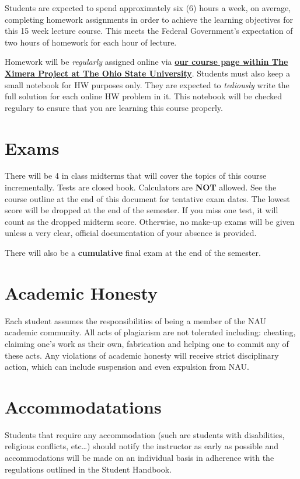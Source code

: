 \documentclass[handout]{ximera}
\begin{document}
Students are expected to spend approximately six (6) hours a week, on average, completing homework assignments in order to achieve the learning objectives for this 15 week lecture course. This meets the Federal Government’s expectation of two hours of homework for each hour of lecture. 

Homework will be {\it regularly} assigned online via \href{http://ximera.osu.edu/course/oguzkurt/PreAlgebraCourse}{\bf our course page within The Ximera Project at The Ohio State University}. Students must also keep a small notebook for HW purposes only. They are expected to {\it tediously} write the full solution for each online HW problem in it. This notebook will be checked regulary to ensure that you are learning this course properly. 

\section*{Exams}

There will be 4 in class midterms that will cover the topics of this course incrementally. Tests are closed book. Calculators are {\bf NOT} allowed. See the course outline at the end of this document for tentative exam dates. The lowest score will be dropped at the end of the semester. If you miss one test, it will count as the dropped midterm score. Otherwise, no make-up exams will be given unless a very clear, official documentation of your absence is provided.

There will also be a {\bf cumulative} final exam at the end of the semester.

\section*{Academic Honesty}

Each student assumes the responsibilities of being a member of the NAU academic community.  All acts of plagiarism are not tolerated including: cheating, claiming one’s work as their own, fabrication and helping one to commit any of these acts.  Any violations of academic honesty will receive strict disciplinary action, which can include suspension and even expulsion from NAU.  

\section*{Accommodatations}

Students that require any accommodation (such are students with disabilities, religious conflicts, etc…) should notify the instructor as early as possible and accommodations will be made on an individual basis in adherence with the regulations outlined in the Student Handbook.
\end{document}
